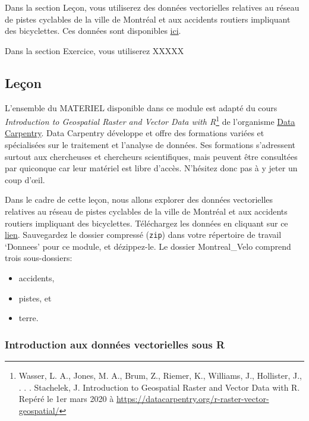 \documentclass[]{article}
\providecommand{\tightlist}{%
  \setlength{\itemsep}{0pt}\setlength{\parskip}{0pt}}
\begin{document}
Dans la section Leçon, vous utiliserez des données vectorielles
relatives au réseau de pistes cyclables de la ville de Montréal et aux
accidents routiers impliquant des bicyclettes. Ces données sont
disponibles
\href{https://github.com/elisefilotas/Donnees_spatiales/blob/master/Montreal_Velo.zip}{ici}.

Dans la section Exercice, vous utiliserez XXXXX

\subsection{Leçon}\label{leuxe7on}

L'ensemble du MATERIEL disponible dans ce module est adapté du cours
\emph{Introduction to Geospatial Raster and Vector Data with
R}\footnote{Wasser, L. A., Jones, M. A., Brum, Z., Riemer, K., Williams,
  J., Hollister, J., . . . Stachelek, J. Introduction to Geospatial
  Raster and Vector Data with R. Repéré le 1er mars 2020 à
  \url{https://datacarpentry.org/r-raster-vector-geospatial/}} de
l'organisme \href{https://datacarpentry.org/}{Data Carpentry}. Data
Carpentry développe et offre des formations variées et spécialisées sur
le traitement et l'analyse de données. Ses formations s'adressent
surtout aux chercheuses et chercheurs scientifiques, mais peuvent être
consultées par quiconque car leur matériel est libre d'accès. N'hésitez
donc pas à y jeter un coup d'œil.

Dans le cadre de cette leçon, nous allons explorer des données
vectorielles relatives au réseau de pistes cyclables de la ville de
Montréal et aux accidents routiers impliquant des bicyclettes.
Téléchargez les données en cliquant sur ce
\href{https://github.com/elisefilotas/Donnees_spatiales/blob/master/Montreal_Velo.zip}{lien}.
Sauvegardez le dossier compressé (\texttt{zip}) dans votre répertoire de
travail `Donnees' pour ce module, et dézippez-le. Le dossier
Montreal\_Velo comprend trois sous-dossiers:

\begin{itemize}
\tightlist
\item
  accidents,
\item
  pistes, et
\item
  terre.
\end{itemize}

\subsubsection{Introduction aux données vectorielles sous
R}\label{introduction-aux-donnuxe9es-vectorielles-sous-r}
\end{document}
